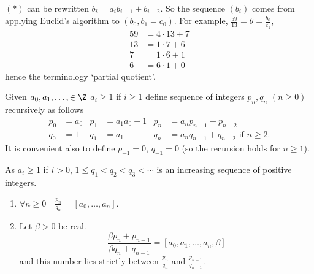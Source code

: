 \documentclass{article}
\begin{document}
\begin{remark}
    $(*)$ can be rewritten $b_i = a_i b_{i+1} + b_{i+2}$.
    So the sequence $(b_i)$ comes from applying Euclid's algorithm to $(b_0, b_1=c_0)$. For example, $\frac{59}{13} = \theta = \frac{b_0}{c_1}$,
    \begin{align*}
        59 &= 4 \cdot 13 + 7 \\
        13 &= 1 \cdot 7 + 6 \\
        7 &= 1 \cdot 6 + 1 \\
        6 &= 6 \cdot 1 + 0
    \end{align*}
    hence the terminology `partial quotient'.
\end{remark}

\begin{defi}
    Given $a_0, a_1, \dotsc, \in \Z$ $a_i \geq 1$ if $i \geq 1$ define sequence of integers $p_n, q_n$ $(n \geq 0)$ recursively as follows
    \begin{align*}
        p_0 &= a_0 & p_1 &= a_1 a_0 + 1 & p_n &= a_n p_{n-1} + p_{n-2} \\
        q_0 &= 1   & q_1 &= a_1         & q_n &= a_n q_{n-1} + q_{n-2} \text{ if } n \geq 2.
    \end{align*}
    It is convenient also to define $p_{-1} = 0$, $q_{-1} = 0$ (so the recursion holds for $n \geq 1$).

    As $a_i \geq 1$ if $i > 0$, $1 \leq q_1 < q_2 < q_3 < \dotsb$ is an increasing sequence of positive integers.
\end{defi}

\begin{nlemma}\label{lem:6.2}
    \leavevmode
    \begin{enumerate}[label=(\roman*)]
        \item $\forall n \geq 0 \quad \frac{p_n}{q_n} = [a_0, \dotsc, a_n]$.
        \item Let $\beta > 0$ be real.
            \begin{equation*}
                \frac{\beta p_n + p_{n-1}}{\beta q_n + q_{n-1}} = [a_0, a_1, \dotsc, a_n, \beta]
            \end{equation*}
            and this number lies strictly between $\frac{p_n}{q_n}$ and $\frac{p_{n-1}}{q_{n-1}}$.
    \end{enumerate}
\end{nlemma}
\end{document}
